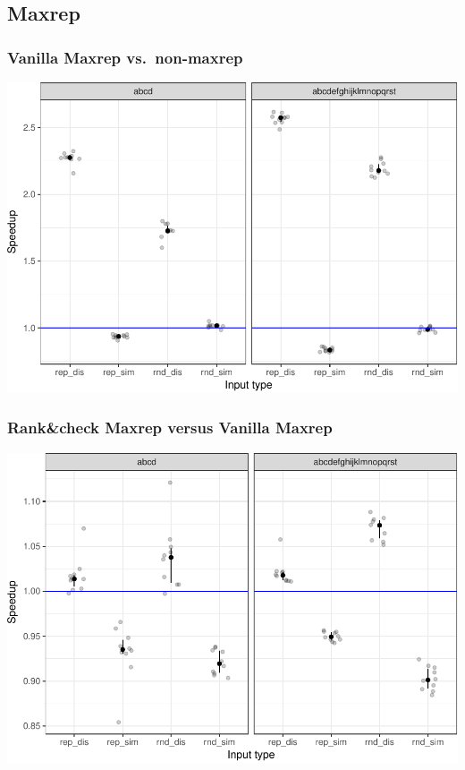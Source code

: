 \documentclass[]{article}
\begin{document}
\subsection{Maxrep}\label{maxrep}

\subsubsection{Vanilla Maxrep
vs.~non-maxrep}\label{vanilla-maxrep-vs.non-maxrep}

\includegraphics{sea_2018_files/figure-latex/maxrep1_plot-1.pdf}

\subsubsection{Rank\&check Maxrep versus Vanilla
Maxrep}\label{rankcheck-maxrep-versus-vanilla-maxrep}

\includegraphics{sea_2018_files/figure-latex/maxrep2_plot-1.pdf}
\end{document}
